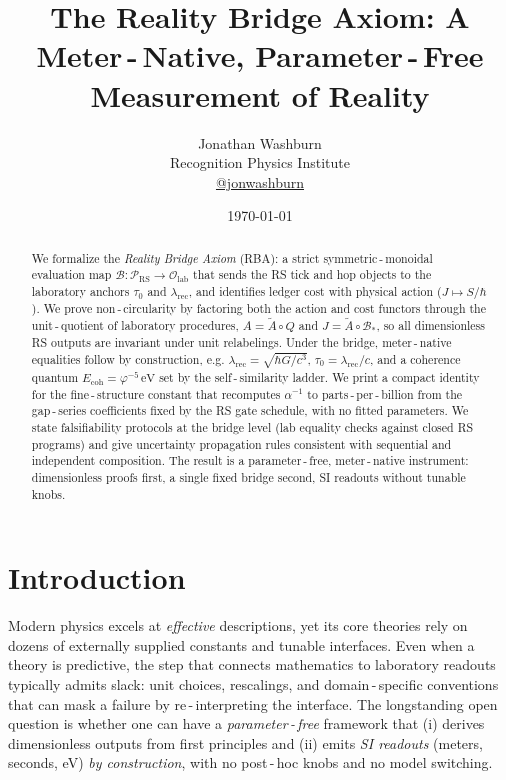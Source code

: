 \documentclass[11pt]{article}
\title{\textbf{The Reality Bridge Axiom: A Meter\,\mbox{-}\,Native, Parameter\,\mbox{-}\,Free Measurement of Reality}}
\author{Jonathan Washburn \\
\small Recognition Physics Institute \\
\small \href{https://twitter.com/jonwashburn}{@jonwashburn}}
\date{\today}
\theoremstyle{remark}
\begin{document}
\maketitle

\begin{abstract}
\noindent
We formalize the \emph{Reality Bridge Axiom} (RBA): a strict symmetric\,\mbox{-}\,monoidal evaluation map
$\mathcal B:\mathcal P_{\mathrm{RS}}\!\to\!\mathcal O_{\mathrm{lab}}$ that sends the RS tick and hop objects to the laboratory anchors
$\tau_{0}$ and $\lambda_{\mathrm{rec}}$, and identifies ledger cost with physical action ($J\mapsto S/\hbar$). We prove non\,\mbox{-}\,circularity by factoring both the action and cost functors through the unit\,\mbox{-}\,quotient of laboratory procedures,
$A=\widetilde A\circ Q$ and $J=\widetilde A\circ\mathcal B_{\!*}$, so all dimensionless RS outputs are invariant under unit relabelings. Under the bridge, meter\,\mbox{-}\,native equalities follow by construction, e.g.
$\lambda_{\mathrm{rec}}=\sqrt{\hbar G/c^{3}}$, $\tau_{0}=\lambda_{\mathrm{rec}}/c$, and a coherence quantum $E_{\mathrm{coh}}=\varphi^{-5}\,\mathrm{eV}$ set by the self\,\mbox{-}\,similarity ladder. We print a compact identity for the fine\,\mbox{-}\,structure constant that recomputes $\alpha^{-1}$ to parts\,\mbox{-}\,per\,\mbox{-}\,billion from the gap\,\mbox{-}\,series coefficients fixed by the RS gate schedule, with no fitted parameters. We state falsifiability protocols at the bridge level (lab equality checks against closed RS programs) and give uncertainty propagation rules consistent with sequential and independent composition. The result is a parameter\,\mbox{-}\,free, meter\,\mbox{-}\,native instrument: dimensionless proofs first, a single fixed bridge second, SI readouts without tunable knobs.
\end{abstract}

\section{Introduction}
Modern physics excels at \emph{effective} descriptions, yet its core theories rely on
dozens of externally supplied constants and tunable interfaces. Even when a theory
is predictive, the step that connects mathematics to laboratory readouts typically
admits slack: unit choices, rescalings, and domain\,\mbox{-}\,specific conventions that can
mask a failure by re\,\mbox{-}\,interpreting the interface. The longstanding open question is
whether one can have a \emph{parameter\,\mbox{-}\,free} framework that (i) derives dimensionless
outputs from first principles and (ii) emits \emph{SI readouts} (meters, seconds, eV)
\emph{by construction}, with no post\,\mbox{-}\,hoc knobs and no model switching.
\end{document}
